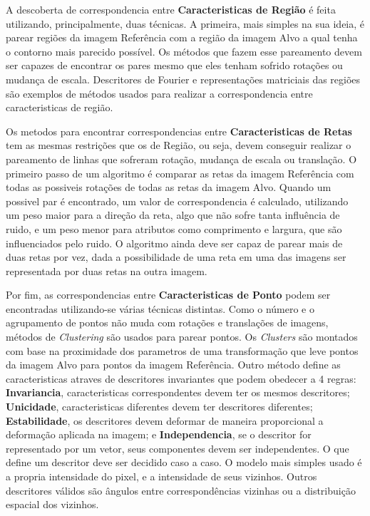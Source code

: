     A descoberta de correspondencia entre \textbf{Caracteristicas de Região} é feita utilizando, principalmente, duas 
técnicas. A primeira, mais simples na sua ideia, é parear regiões da imagem Referência com a região da imagem Alvo a qual
tenha o contorno mais parecido possível. Os métodos que fazem esse pareamento devem ser capazes de encontrar os pares mesmo
que eles tenham sofrido rotações ou mudança de escala. Descritores de Fourier e representações matriciais das regiões são
exemplos de métodos usados para realizar a correspondencia entre caracteristicas de região.

    Os metodos para encontrar correspondencias entre \textbf{Caracteristicas de Retas} tem as mesmas restrições que os
de Região, ou seja, devem conseguir realizar o pareamento de linhas que sofreram rotação, mudança de escala ou translação.
O primeiro passo de um algoritmo é comparar as retas da imagem Referência com todas as possiveis rotações de todas as retas
da imagem Alvo. Quando um possivel par é encontrado, um valor de correspondencia é calculado, utilizando um peso maior para
a direção da reta, algo que não sofre tanta influência de ruido, e um peso menor para atributos como comprimento e largura,
que são influenciados pelo ruido. O algoritmo ainda deve ser capaz de parear mais de duas retas por vez, dada a possibilidade
de uma reta em uma das imagens ser representada por duas retas na outra imagem.

    Por fim, as correspondencias entre \textbf{Caracteristicas de Ponto} podem ser encontradas utilizando-se várias técnicas
distintas. Como o número e o agrupamento de pontos não muda com rotações e translações de imagens, métodos de 
\textit{Clustering} são usados para parear pontos. Os \textit{Clusters} são montados com base na proximidade dos parametros
de uma transformação que leve pontos da imagem Alvo para pontos da imagem Referência. Outro método define as caracteristicas
atraves de descritores invariantes que podem obedecer a 4 regras: \textbf{Invariancia}, caracteristicas correspondentes 
devem ter os mesmos descritores; \textbf{Unicidade}, caracteristicas diferentes devem ter descritores diferentes; 
\textbf{Estabilidade}, os descritores devem deformar de maneira proporcional a deformação aplicada na imagem; e 
\textbf{Independencia}, se o descritor for representado por um vetor, seus componentes devem ser independentes. 
O que define um descritor deve ser decidido caso a caso. O modelo mais simples usado é a propria intensidade do pixel, 
e a intensidade de seus vizinhos. Outros descritores válidos são ângulos entre correspondências vizinhas ou a distribuição
espacial dos vizinhos.

